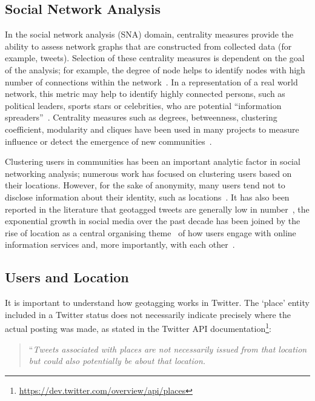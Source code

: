 \subsection{Social Network Analysis}

In the social network analysis (SNA) domain, centrality measures
provide the ability to assess network graphs that are constructed from
collected data (for example, tweets). Selection of these centrality
measures is dependent on the goal of the analysis; for example, the
degree of node helps to identify nodes with high number of connections
within the
network~\cite{borgatti+everett:2000,rombach-et-al:2014,liu-et-al:2014}.
In a representation of a real world network, this metric may help to
identify highly connected persons, such as political leaders, sports
stars or celebrities, who are potential ``information
spreaders''~\cite{cha-et-al:2012,borge-holthoefer-et-al:2012,zhang-et-al:2016}.
Centrality measures such as degrees, betweenness, clustering
coefficient, modularity and cliques have been used in many projects to
measure influence or detect the emergence of new
communities~\cite{willis-et-al:2015,oatley+crick:2015}.

Clustering users in communities has been an important analytic factor
in social networking analysis; numerous work has focused on clustering
users based on their locations. However, for the sake of anonymity,
many users tend not to disclose information about their identity, such
as locations~\cite{kang-et-al:2013}. It has also been reported in the
literature that geotagged tweets are generally low in
number~\cite{morstatter-et-al:2013,tan-et-al:2013,kumar-et-al:2014},
the exponential growth in social media over the past decade has been
joined by the rise of location as a central organising
theme~\cite{liang-et-al:2013} of how users engage with online
information services and, more importantly, with each
other~\cite{cheng-et-al:2010,caverlee-et-al:2013}.

\subsection{Users and Location}

It is important to understand how geotagging works in Twitter. The
`place' entity included in a Twitter status does not necessarily
indicate precisely where the actual posting was made, as stated in the
Twitter API
documentation\footnote{\url{https://dev.twitter.com/overview/api/places}}:

\begin{quotation} ``{\emph{Tweets associated with places are not
necessarily issued from that location but could also potentially be
about that location.}}
\end{quotation}

